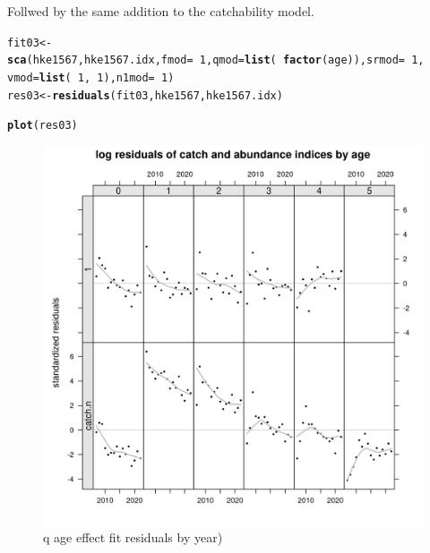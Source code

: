\documentclass[a4paper,english,11pt]{article}\usepackage[]{graphicx}\usepackage[]{xcolor}
\makeatletter
\newcommand{\hlnum}[1]{\textcolor[rgb]{0.686,0.059,0.569}{#1}}%
\newcommand{\hlopt}[1]{\textcolor[rgb]{0,0,0}{#1}}%
\newcommand{\hldef}[1]{\textcolor[rgb]{0.345,0.345,0.345}{#1}}%
\newcommand{\hlkwb}[1]{\textcolor[rgb]{0.69,0.353,0.396}{#1}}%
\newcommand{\hlkwc}[1]{\textcolor[rgb]{0.333,0.667,0.333}{#1}}%
\newcommand{\hlkwd}[1]{\textcolor[rgb]{0.737,0.353,0.396}{\textbf{#1}}}%
\newenvironment{kframe}{%
 \def\at@end@of@kframe{}%
 \ifinner\ifhmode%
  \def\at@end@of@kframe{\end{minipage}}%
  \begin{minipage}{\columnwidth}%
 \fi\fi%
 \def\FrameCommand##1{\hskip\@totalleftmargin \hskip-\fboxsep
 \colorbox{shadecolor}{##1}\hskip-\fboxsep
     \hskip-\linewidth \hskip-\@totalleftmargin \hskip\columnwidth}%
 \MakeFramed {\advance\hsize-\width
   \@totalleftmargin\z@ \linewidth\hsize
   \@setminipage}}%
 {\par\unskip\endMakeFramed%
 \at@end@of@kframe}
\newenvironment{knitrout}{}{} %
\makeatother
\begin{document}
Follwed by the same addition to the catchability model.

\begin{knitrout}
\color{fgcolor}\begin{kframe}
\begin{alltt}
\hldef{fit03} \hlkwb{<-} \hlkwd{sca}\hldef{(hke1567, hke1567.idx,} \hlkwc{fmod} \hldef{=} \hlopt{~}\hlnum{1}\hldef{,} \hlkwc{qmod} \hldef{=} \hlkwd{list}\hldef{(}\hlopt{~}\hlkwd{factor}\hldef{(age)),} \hlkwc{srmod} \hldef{=} \hlopt{~}\hlnum{1}\hldef{,}
    \hlkwc{vmod} \hldef{=} \hlkwd{list}\hldef{(}\hlopt{~}\hlnum{1}\hldef{,} \hlopt{~}\hlnum{1}\hldef{),} \hlkwc{n1mod} \hldef{=} \hlopt{~}\hlnum{1}\hldef{)}
\hldef{res03} \hlkwb{<-} \hlkwd{residuals}\hldef{(fit03, hke1567, hke1567.idx)}
\end{alltt}
\end{kframe}
\end{knitrout}

\begin{knitrout}
\color{fgcolor}\begin{kframe}
\begin{alltt}
\hlkwd{plot}\hldef{(res03)}
\end{alltt}
\end{kframe}\begin{figure}[H]

{\centering \includegraphics[width=.9\linewidth]{figure/qageresbyyear-1} 

}

\caption[q age effect fit residuals by year)]{q age effect fit residuals by year)}\label{fig:qageresbyyear}
\end{figure}

\end{knitrout}
\end{document}
